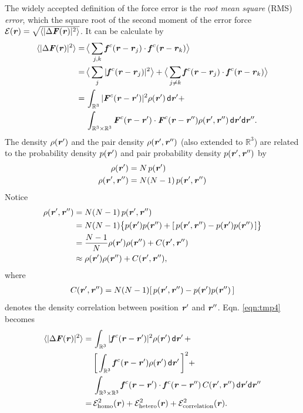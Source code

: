 \documentclass[aps,pre,preprint]{revtex4}
\renewcommand{\v}[1]{\textbf{\textit{#1}}}
\renewcommand{\d}[1]{\textsf{#1}}
\begin{document}
The widely accepted definition of the force error is the \emph{root
  mean square} (RMS) \emph{error}, which the square root of the second
moment of the error force $\mathcal E(\v r) =
\sqrt{\langle\vert\Delta\v F(\v r)\vert^2\rangle}$. It can be
calculate by
\begin{align} \nonumber
  \langle\vert\Delta\v F(\v r)\vert^2\rangle
  =\,&
  \big\langle\sum_{j,k}\v f^c(\v r - \v r_j)\cdot\v f^c(\v r - \v r_k)\big\rangle \\ \nonumber
  =\,&
  \big\langle\sum_j\vert\v f^c(\v r - \v r_j)\vert^2\big\rangle +
  \big\langle\sum_{j\neq k}\v f^c(\v r - \v r_j)\cdot\v f^c(\v r - \v r_k)\big\rangle \\ \nonumber
  =\,&
  \int_{\mathbb R^3}\vert\v F^c(\v r - \v r')\vert^2\rho(\v r')\,\d d\v r'
  + \\\label{eqn:tmp4}
  \,&
  \int_{\mathbb R^3\times\mathbb R^3}\v F^c(\v r - \v r')\cdot\v F^c(\v r - \v r'')\rho(\v r', \v r'')\,\d d\v r'\d d\v r''.
\end{align}
The density $\rho(\v r')$ and the pair density $\rho(\v r', \v r'')$
(also extended to $\mathbb R^3$) are related to the probability
density $p(\v r')$ and pair probability density $p(\v r', \v r'')$ by
\begin{align}
  \rho(\v r') &= N\,p(\v r') \\
  \rho(\v r', \v r'') &= N(N-1)\,p(\v r', \v r'')
\end{align}
Notice
\begin{align} \nonumber
  \rho(\v r', \v r'')
  & = N (N-1) \,p(\v r', \v r'') \\\nonumber
  & = N (N-1) \big\{ p(\v r')p(\v r'') + [\,p(\v r', \v r'') -  p(\v r')p(\v r'')\,]\big\} \\\nonumber
  &= \frac{N-1}N \rho(\v r')\rho(\v r'') + C (\v r', \v r'')\\ \label{eqn:tmp7}
  &\approx \rho(\v r')\rho(\v r'') + C (\v r', \v r''),
\end{align}
where 
\begin{align}
C (\v r', \v r'') = N (N-1) [\,p(\v r', \v r'') -  p(\v r')p(\v r'')\,]
\end{align}
denotes the density correlation between position $\v r'$ and $\v
r''$. Eqn. \eqref{eqn:tmp4} becomes
\begin{align} \nonumber
  \langle\vert\Delta\v F(\v r)\vert^2\rangle
  = &\,
  \int_{\mathbb R^3}\vert\v f^c(\v r - \v r')\vert^2\rho(\v r')\,\d d\v r' \,+ \\\nonumber
  &\,
  \bigg[\int_{\mathbb R^3}\v f^c(\v r - \v r')\rho(\v r')\,\d d\v r'\,\bigg]^2 + \\\nonumber
  &\,
  \int_{\mathbb R^3\times\mathbb R^3}\v f^c(\v r - \v r')\cdot\v f^c(\v r - \v r'')\,C(\v r', \v r'')\,\d d\v r'\d d\v r'' \\\label{eqn:tmp5}
  = &\,
  \mathcal E^2_{\textrm{homo}}(\v r) +
  \mathcal E^2_{\textrm{hetero}}(\v r) +
  \mathcal E^2_{\textrm{correlation}}(\v r).
\end{align}
\end{document}
